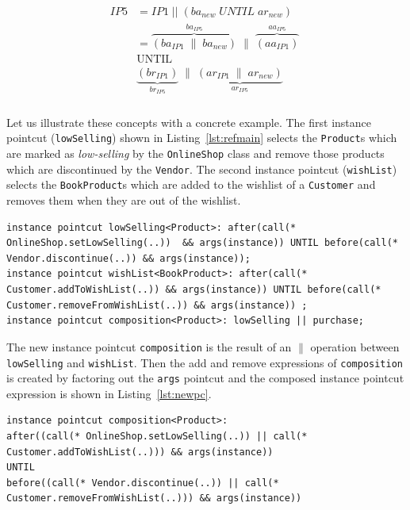 \documentclass{acm_proc_article-sp}
\begin{document}
\begin{align}
\begin{split}
IP5 & = IP1\;||\;(ba_{new}\;UNTIL\;ar_{new}) \\
   & = \overbrace{\left( ba_{IP1}\;\|\;ba_{new}\right)}^{ba_{IP5}}\;\|\;\overbrace{\left( aa_{IP1} \right)}^{aa_{IP5}}\;\\
&\textrm{UNTIL} \\
&\underbrace{\left( br_{IP1}\right)}_{br_{IP5}}\;\|\;\underbrace{\left( ar_{IP1}\;\|\;ar_{new} \right)}_{ar_{IP5}}\;\\  
\end{split}
\end{align}

Let us illustrate these concepts with a concrete example. The first instance pointcut  (\texttt{lowSelling})  shown in Listing~\ref{lst:refmain} selects the \texttt{Product}s which are marked as \emph{low-selling} by the \texttt{OnlineShop} class and remove those products which are discontinued by the \texttt{Vendor}. The second instance pointcut (\texttt{wishList})  selects the \texttt{BookProduct}s which are added to the wishlist of a \texttt{Customer} and removes them when they are out of the wishlist.

\begin{lstlisting}[float=h!, caption={Two instance pointcuts composed to obtain a new one}, label={lst:refmain}]
instance pointcut lowSelling<Product>: after(call(* OnlineShop.setLowSelling(..))  && args(instance)) UNTIL before(call(* Vendor.discontinue(..)) && args(instance));
instance pointcut wishList<BookProduct>: after(call(* Customer.addToWishList(..)) && args(instance)) UNTIL before(call(* Customer.removeFromWishList(..)) && args(instance)) ;
instance pointcut composition<Product>: lowSelling || purchase;
\end{lstlisting}

The new instance pointcut \texttt{composition} is the result of an $\|$ operation between \texttt{lowSelling} and \texttt{wishList}. Then the add and remove expressions of \texttt{composition} is created by factoring out the \texttt{args} pointcut and the composed instance pointcut expression is shown in Listing~\ref{lst:newpc}. 

\begin{lstlisting}[float=h!, caption={The new instance pointcut after composition}, label={lst:newpc}]
instance pointcut composition<Product>: 
after((call(* OnlineShop.setLowSelling(..)) || call(* Customer.addToWishList(..))) && args(instance)) 
UNTIL 
before((call(* Vendor.discontinue(..)) || call(* Customer.removeFromWishList(..))) && args(instance))
\end{lstlisting}
\end{document}
